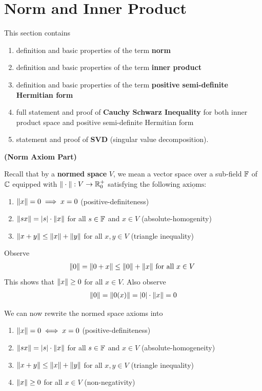 \documentclass{report}
\begin{document}
\section{Norm and Inner Product}
\begin{mdframed}
This section contains
\begin{enumerate}[label=(\alph*)]
  \item definition and basic properties of the term \textbf{norm}
  \item definition and basic properties of the term \textbf{inner product}
  \item definition and basic properties of the term \textbf{positive semi-definite Hermitian form}
  \item full statement and proof of \textbf{Cauchy Schwarz Inequality} for both inner product space and positive semi-definite Hermitian form  
  \item statement and proof of \textbf{SVD} (singular value decomposition). 
\end{enumerate}
\end{mdframed}
\textbf{(Norm Axiom Part)}
\begin{mdframed}
Recall that by a \textbf{normed space} $V$, we mean a vector space over a sub-field $\mathbb{F}$ of $\mathbb{C}$ equipped with  $\| \cdot \|:V\to \mathbb{R}_0^+$ satisfying the following $\underline{\text{axioms}}$: 
\begin{enumerate}[label=(\alph*)]
  \item $\| x \|=0 \implies x=0$ (positive-definiteness)
  \item $\| sx \|=\left|s\right|\cdot \| x \|$ for all $s \in \mathbb{F}$ and $x\in V$ (absolute-homogenity)
  \item $\| x+y \|\leq \| x \|+\| y \|$ for all $x,y \in V$ (triangle inequality)
\end{enumerate}
Observe
\begin{align*}
\| 0 \|=\| 0+x \|\leq \| 0 \|+\| x \|\text{ for all $x\in V$ }
\end{align*}
This shows that $\| x \|\geq 0$ for all $x\in V$. Also observe 
\begin{align*}
\| 0 \|=\| 0(x) \|=\left|0\right|\cdot \| x \|=0
\end{align*}

We can now rewrite the normed space axioms into
\begin{enumerate}[label=(\alph*)]
  \item $\| x \|=0\iff x=0$ (positive-definiteness)
  \item $\| sx \|=\left|s\right|\cdot \| x \|$ for all $s \in \mathbb{F}$ and $x\in V$ (absolute-homogeneity)
  \item $\| x+y \|\leq \| x \|+\| y \|$ for all $x,y \in V$ (triangle inequality)
  \item $\| x \|\geq 0$ for all $x \in V$ (non-negativity)
\end{enumerate}
\end{mdframed}
\end{document}
